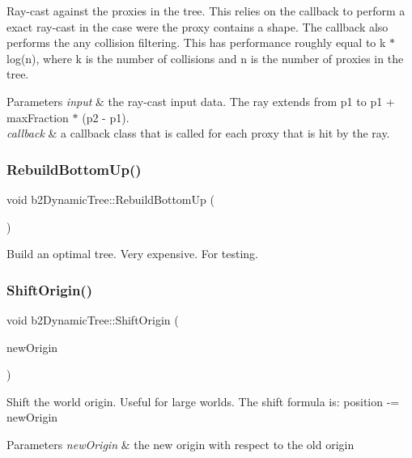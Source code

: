 Ray-\/cast against the proxies in the tree. This relies on the callback to perform a exact ray-\/cast in the case were the proxy contains a shape. The callback also performs the any collision filtering. This has performance roughly equal to k $\ast$ log(n), where k is the number of collisions and n is the number of proxies in the tree. 
\begin{DoxyParams}{Parameters}
{\em input} & the ray-\/cast input data. The ray extends from p1 to p1 + max\+Fraction $\ast$ (p2 -\/ p1). \\
\hline
{\em callback} & a callback class that is called for each proxy that is hit by the ray. \\
\hline
\end{DoxyParams}
\mbox{\label{classb2_dynamic_tree_abd146017cfec1cf5ea7b87331f30a3ff}} 
\subsubsection{\texorpdfstring{RebuildBottomUp()}{RebuildBottomUp()}}
{\footnotesize\ttfamily void b2\+Dynamic\+Tree\+::\+Rebuild\+Bottom\+Up (\begin{DoxyParamCaption}{ }\end{DoxyParamCaption})}



Build an optimal tree. Very expensive. For testing. 

\mbox{\label{classb2_dynamic_tree_af37ddfed6a5da97d5a78b09918d19ceb}} 
\subsubsection{\texorpdfstring{ShiftOrigin()}{ShiftOrigin()}}
{\footnotesize\ttfamily void b2\+Dynamic\+Tree\+::\+Shift\+Origin (\begin{DoxyParamCaption}\item[{const \mbox{\hyperlink{structb2_vec2}{b2\+Vec2}} \&}]{new\+Origin }\end{DoxyParamCaption})}

Shift the world origin. Useful for large worlds. The shift formula is\+: position -\/= new\+Origin 
\begin{DoxyParams}{Parameters}
{\em new\+Origin} & the new origin with respect to the old origin \\
\hline
\end{DoxyParams}
\mbox{\label{classb2_dynamic_tree_ae9b989f0c04e38f9c940623d4e1728b9}} 
